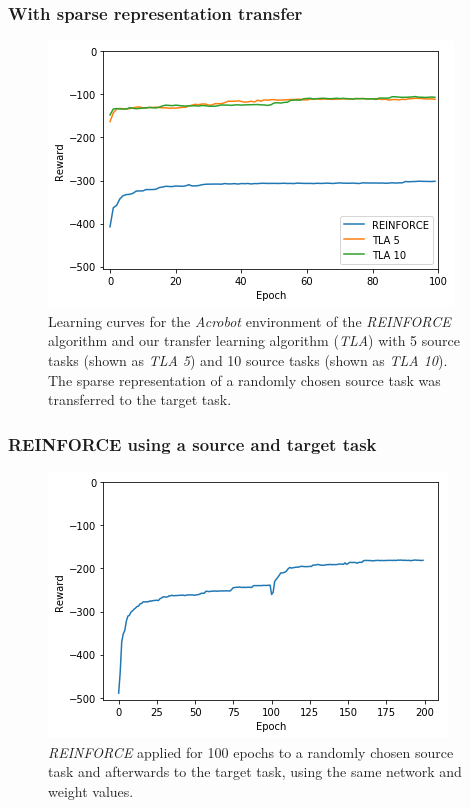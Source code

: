 \subsubsection{With sparse representation transfer} %
\label{ssub:acrobot:with_sparse_representation_transfer}
\begin{figure}[H]
    \centering
    \includegraphics[width=.8\linewidth]{images/results/Acrobot/sparse_transfer/reward_target_re-akt5-akt10.png}
    \caption[Learning curves for the \textit{Acrobot} environment of \textit{REINFORCE} and \textit{TLA} using sparse representation transfer]{Learning curves for the \emph{Acrobot} environment of the \textit{REINFORCE} algorithm and our transfer learning algorithm (\textit{TLA}) with 5 source tasks (shown as \textit{TLA 5}) and 10 source tasks (shown as \textit{TLA 10}). The sparse representation of a randomly chosen source task was transferred to the target task.}
    \label{fig:Acrobot:st:reward_target_re-akt5-akt10}
\end{figure}
\subsubsection{REINFORCE using a source and target task} %
\label{ssub:reinforce_using_a_source_and_target_task}
\begin{figure}[H]
    \centering
    \includegraphics[width=.8\linewidth]{images/results/Acrobot/reinforce_2tasks.png}
    \caption{\textit{REINFORCE} applied for 100 epochs to a randomly chosen source task and afterwards to the target task, using the same network and weight values.}
    \label{fig:Acrobot:reward_reinforce_2tasks}
\end{figure}
